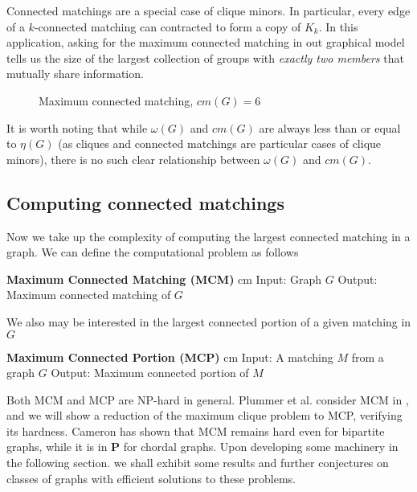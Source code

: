 Connected matchings are a special case of clique minors.  In particular, every edge of a $k$-connected matching can contracted to form a copy of $K_k$.  In this application, asking for the maximum connected matching in out graphical model tells us the size of the largest collection of groups with \textit{exactly two members} that mutually share information. 
\begin{figure}[h]
\begin{center}\end{center}
\caption{Maximum connected matching, $cm(G) = 6$}
\label{soc_net_conmatch}
\end{figure} 
It is worth noting that while $\omega(G)$ and $cm(G)$ are always less than or equal to $\eta(G)$ (as cliques and connected matchings are particular cases of clique minors), there is no such clear relationship between $\omega(G)$ and $cm(G)$.

\subsection{Computing connected matchings}
Now we take up the complexity of computing the largest connected matching in a graph.  We can define the computational problem as follows
{\linespread{1.2}\begin{framed}
  \noindent \textbf{Maximum Connected Matching (MCM)}
   cm 
  \noindent Input: Graph $G$
  \newline Output: Maximum connected matching of $G$
 \end{framed}
We also may be interested in the largest connected portion of a given matching in $G$
 \begin{framed}
  \noindent \textbf{Maximum Connected Portion (MCP)}
   cm 
  \noindent Input: A matching $M$ from a graph $G$
  \newline Output: Maximum connected portion of $M$
\end{framed}}
Both MCM and MCP are NP-hard in general.  Plummer et al. consider MCM in \cite{Spec_case}, and we will show a reduction of the maximum clique problem to MCP, verifying its hardness.  Cameron \cite{K_Cam} has shown that MCM remains hard even for bipartite graphs, while it is in $\mathbf{P}$ for chordal graphs.  Upon developing some machinery in the following section. we shall exhibit some results and further conjectures on classes of graphs with efficient solutions to these problems.

